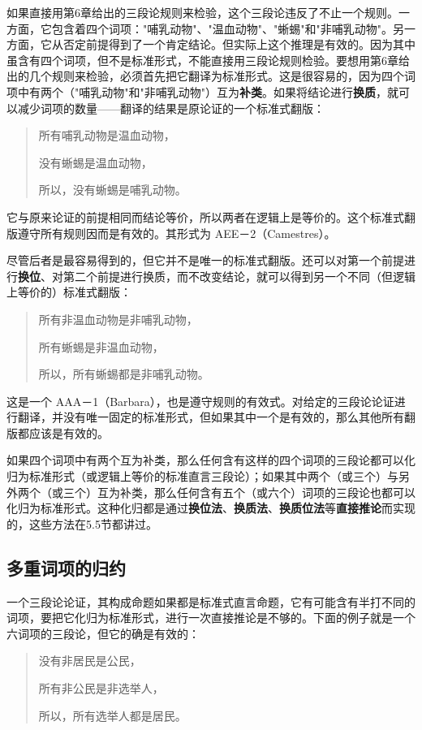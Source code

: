 如果直接用第6章给出的三段论规则来检验，这个三段论违反了不止一个规则。一方面，它包含着四个词项："哺乳动物"、"温血动物"、"蜥蜴"和"非哺乳动物"。另一方面，它从否定前提得到了一个肯定结论。但实际上这个推理是有效的。因为其中虽含有四个词项，但不是标准形式，不能直接用三段论规则检验。要想用第6章给出的几个规则来检验，必须首先把它翻译为标准形式。这是很容易的，因为四个词项中有两个（"哺乳动物"和"非哺乳动物"）互为\textbf{补类}。如果将结论进行\textbf{换质}，就可以减少词项的数量——翻译的结果是原论证的一个标准式翻版：

\begin{quote}
所有哺乳动物是温血动物，

没有蜥蜴是温血动物，

所以，没有蜥蜴是哺乳动物。
\end{quote}

它与原来论证的前提相同而结论等价，所以两者在逻辑上是等价的。这个标准式翻版遵守所有规则因而是有效的。其形式为 AEE－2（Camestres）。

尽管后者是最容易得到的，但它并不是唯一的标准式翻版。还可以对第一个前提进行\textbf{换位}、对第二个前提进行换质，而不改变结论，就可以得到另一个不同（但逻辑上等价的）标准式翻版：

\begin{quote}
所有非温血动物是非哺乳动物，

所有蜥蜴是非温血动物，

所以，所有蜥蜴都是非哺乳动物。
\end{quote}

这是一个 AAA－1（Barbara），也是遵守规则的有效式。对给定的三段论论证进行翻译，并没有唯一固定的标准形式，但如果其中一个是有效的，那么其他所有翻版都应该是有效的。

如果四个词项中有两个互为补类，那么任何含有这样的四个词项的三段论都可以化归为标准形式（或逻辑上等价的标准直言三段论）；如果其中两个（或三个）与另外两个（或三个）互为补类，那么任何含有五个（或六个）词项的三段论也都可以化归为标准形式。这种化归都是通过\textbf{换位法}、\textbf{换质法}、\textbf{换质位法}等\textbf{直接推论}而实现的，这些方法在5.5节都讲过。

\subsection{多重词项的归约}
一个三段论论证，其构成命题如果都是标准式直言命题，它有可能含有半打不同的词项，要把它化归为标准形式，进行一次直接推论是不够的。下面的例子就是一个六词项的三段论，但它的确是有效的：

\begin{quote}
没有非居民是公民，

所有非公民是非选举人，

所以，所有选举人都是居民。
\end{quote}

